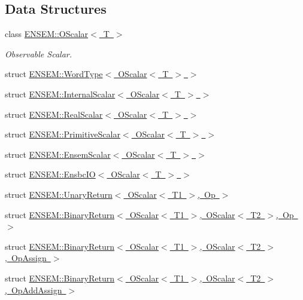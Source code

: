 \subsection*{Data Structures}
\begin{DoxyCompactItemize}
\item 
class \mbox{\hyperlink{classENSEM_1_1OScalar}{E\+N\+S\+E\+M\+::\+O\+Scalar$<$ T $>$}}
\begin{DoxyCompactList}\small\item\em Observable Scalar. \end{DoxyCompactList}\item 
struct \mbox{\hyperlink{structENSEM_1_1WordType_3_01OScalar_3_01T_01_4_01_4}{E\+N\+S\+E\+M\+::\+Word\+Type$<$ O\+Scalar$<$ T $>$ $>$}}
\item 
struct \mbox{\hyperlink{structENSEM_1_1InternalScalar_3_01OScalar_3_01T_01_4_01_4}{E\+N\+S\+E\+M\+::\+Internal\+Scalar$<$ O\+Scalar$<$ T $>$ $>$}}
\item 
struct \mbox{\hyperlink{structENSEM_1_1RealScalar_3_01OScalar_3_01T_01_4_01_4}{E\+N\+S\+E\+M\+::\+Real\+Scalar$<$ O\+Scalar$<$ T $>$ $>$}}
\item 
struct \mbox{\hyperlink{structENSEM_1_1PrimitiveScalar_3_01OScalar_3_01T_01_4_01_4}{E\+N\+S\+E\+M\+::\+Primitive\+Scalar$<$ O\+Scalar$<$ T $>$ $>$}}
\item 
struct \mbox{\hyperlink{structENSEM_1_1EnsemScalar_3_01OScalar_3_01T_01_4_01_4}{E\+N\+S\+E\+M\+::\+Ensem\+Scalar$<$ O\+Scalar$<$ T $>$ $>$}}
\item 
struct \mbox{\hyperlink{structENSEM_1_1EnsbcIO_3_01OScalar_3_01T_01_4_01_4}{E\+N\+S\+E\+M\+::\+Ensbc\+I\+O$<$ O\+Scalar$<$ T $>$ $>$}}
\item 
struct \mbox{\hyperlink{structENSEM_1_1UnaryReturn_3_01OScalar_3_01T1_01_4_00_01Op_01_4}{E\+N\+S\+E\+M\+::\+Unary\+Return$<$ O\+Scalar$<$ T1 $>$, Op $>$}}
\item 
struct \mbox{\hyperlink{structENSEM_1_1BinaryReturn_3_01OScalar_3_01T1_01_4_00_01OScalar_3_01T2_01_4_00_01Op_01_4}{E\+N\+S\+E\+M\+::\+Binary\+Return$<$ O\+Scalar$<$ T1 $>$, O\+Scalar$<$ T2 $>$, Op $>$}}
\item 
struct \mbox{\hyperlink{structENSEM_1_1BinaryReturn_3_01OScalar_3_01T1_01_4_00_01OScalar_3_01T2_01_4_00_01OpAssign_01_4}{E\+N\+S\+E\+M\+::\+Binary\+Return$<$ O\+Scalar$<$ T1 $>$, O\+Scalar$<$ T2 $>$, Op\+Assign $>$}}
\item 
struct \mbox{\hyperlink{structENSEM_1_1BinaryReturn_3_01OScalar_3_01T1_01_4_00_01OScalar_3_01T2_01_4_00_01OpAddAssign_01_4}{E\+N\+S\+E\+M\+::\+Binary\+Return$<$ O\+Scalar$<$ T1 $>$, O\+Scalar$<$ T2 $>$, Op\+Add\+Assign $>$}}

\end{DoxyCompactItemize}
